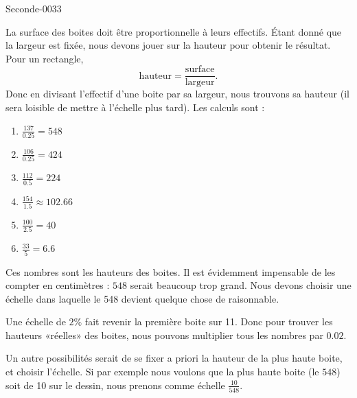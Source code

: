 
\begin{corrige}{Seconde-0033}

    La surface des boites doit être proportionnelle à leurs effectifs. Étant donné que la largeur est fixée, nous devons jouer sur la hauteur pour obtenir le résultat. Pour un rectangle,
    \begin{equation}
        \text{hauteur}=\frac{ \text{surface} }{ \text{largeur} }.
    \end{equation}
    Donc en divisant l'effectif d'une boite par sa largeur, nous trouvons sa hauteur (il sera loisible de mettre à l'échelle plus tard). Les calculs sont :
    \begin{enumerate}
        \item
            \( \frac{ 137 }{ 0.25 }=548\)
        \item
            \( \frac{ 106 }{ 0.25 }=424\)
        \item
            \( \frac{ 112 }{ 0.5 }=224\)
        \item
            \( \frac{ 154 }{ 1.5 }\approx 102.66\)
        \item
            \( \frac{ 100 }{ 2.5 }=40\)
        \item
            \( \frac{ 33 }{ 5 }=6.6\)
    \end{enumerate}
    Ces nombres sont les hauteurs des boites. Il est évidemment impensable de les compter en centimètres : \( 548\) serait beaucoup trop grand. Nous devons choisir une échelle dans laquelle le 548 devient quelque chose de raisonnable.

    Une échelle de \( 2\%\) fait revenir la première boite sur \unit{11}{\centi\meter}. Donc pour trouver les hauteurs «réelles» des boites, nous pouvons multiplier tous les nombres par \( 0.02\).

    Un autre possibilités serait de se fixer a priori la hauteur de la plus haute boite, et choisir l'échelle. Si par exemple nous voulons que la plus haute boite (le \( 548\)) soit de \unit{10}{\centi\meter} sur le dessin, nous prenons comme échelle \( \frac{ 10 }{ 548 }\).


\end{corrige}
